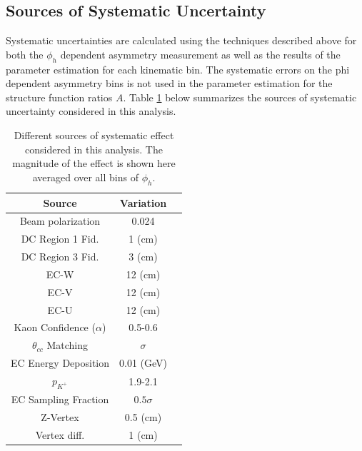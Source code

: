 \subsection{Sources of Systematic Uncertainty}
Systematic uncertainties are calculated using the techniques described above for both the $\phi_h$ dependent asymmetry measurement as well as the results of the parameter estimation for each kinematic bin.  The systematic errors on the phi dependent asymmetry bins is not used in the parameter estimation for the structure function ratios $A$.  Table \ref{table:kaon-systematics} below summarizes the sources of systematic uncertainty considered in this analysis.

\begin{table}
  \centering
  \begin{tabular}{c|c|c}
    Source                     & Variation  \\ 
    \hline
    Beam polarization                  & 0.024        \\ 
    DC Region 1 Fid.                     & 1 (cm)         \\ 
    DC Region 3 Fid.                    & 3 (cm)        \\
    EC-W                                       & 12 (cm)         \\ 
    EC-V                                        & 12 (cm)        \\
    EC-U                                        & 12 (cm)        \\
    Kaon Confidence ($\alpha$) & 0.5-0.6     \\
    $\theta_{cc}$ Matching         & $\sigma$        \\
    EC Energy Deposition            & 0.01 (GeV)      \\
    $p_{K^+}$                               & 1.9-2.1  \\ 
    EC Sampling Fraction             & $0.5 \sigma$    \\
    Z-Vertex                                  & 0.5 (cm)        \\
    Vertex diff.                              & 1 (cm)  \\
    \hline 
  \end{tabular}
  \caption{Different sources of systematic effect considered in this analysis.  The magnitude of the effect is shown here averaged over all bins of $\phi_h$.}
  \label{table:kaon-systematics}
\end{table}

